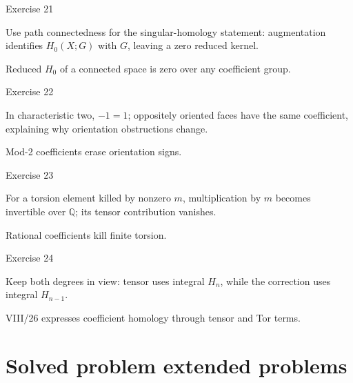 \begin{exercise}\label{exr:viii25-21}
Exercise 21
\end{exercise}
\begin{hint}
Use path connectedness for the singular-homology statement: augmentation identifies \(H_0(X;G)\) with \(G\), leaving a zero reduced kernel.
\end{hint}
\begin{solution}
Reduced \(H_0\) of a connected space is zero over any coefficient group.
\end{solution}

\begin{exercise}\label{exr:viii25-22}
Exercise 22
\end{exercise}
\begin{hint}
In characteristic two, \(-1=1\); oppositely oriented faces have the same coefficient, explaining why orientation obstructions change.
\end{hint}
\begin{solution}
Mod-2 coefficients erase orientation signs.
\end{solution}

\begin{exercise}\label{exr:viii25-23}
Exercise 23
\end{exercise}
\begin{hint}
For a torsion element killed by nonzero \(m\), multiplication by \(m\) becomes invertible over \(\mathbb Q\); its tensor contribution vanishes.
\end{hint}
\begin{solution}
Rational coefficients kill finite torsion.
\end{solution}

\begin{exercise}\label{exr:viii25-24}
Exercise 24
\end{exercise}
\begin{hint}
Keep both degrees in view: tensor uses integral \(H_n\), while the correction uses integral \(H_{n-1}\).
\end{hint}
\begin{solution}
VIII/26 expresses coefficient homology through tensor and Tor terms.
\end{solution}


\section{Solved problem extended problems}

